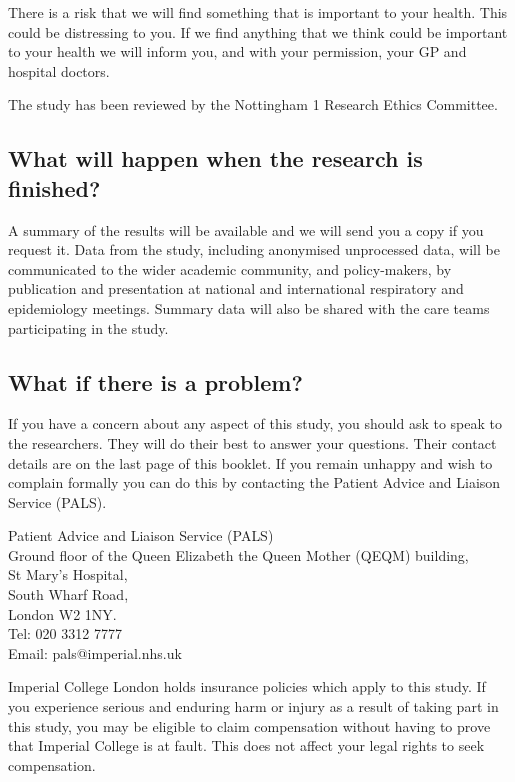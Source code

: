 \documentclass[a4paper,10pt]{article}
\begin{document}
There is a risk that we will find something that is important to your health. This could be distressing to you. If we find anything that we think could be important to your health we will inform you, and with your permission, your GP and hospital doctors. 

The study has been reviewed by the Nottingham 1 Research Ethics Committee.

\subsection*{What will happen when the research is finished?}

A summary of the results will be available and we will send you a copy if you request it. Data from the study, including anonymised unprocessed data, will be communicated to the wider academic community, and policy-makers, by publication and presentation at national and international respiratory and epidemiology meetings. Summary data will also be shared with the care teams participating in the study. 

\subsection*{What if there is a problem?}

If you have a concern about any aspect of this study, you should ask to speak to the researchers. They will do their best to answer your questions. Their contact details are on the last page of this booklet. If you remain unhappy and wish to complain formally you can do this by contacting the Patient Advice and Liaison Service (PALS). \\

\newpage

\begin{flushleft}

Patient Advice and Liaison Service (PALS) \\    
Ground floor of the Queen Elizabeth the Queen Mother (QEQM) building, \\
St Mary’s Hospital, \\
South Wharf Road,\\
London W2 1NY.\\
Tel: 020 3312 7777\\
Email: pals@imperial.nhs.uk\\

\end{flushleft}

Imperial College London holds insurance policies which apply to this study. If you experience serious and enduring harm or injury as a result of taking part in this study, you may be eligible to claim compensation without having to prove that Imperial College is at fault. This does not affect your legal rights to seek compensation.
 
\end{document}
